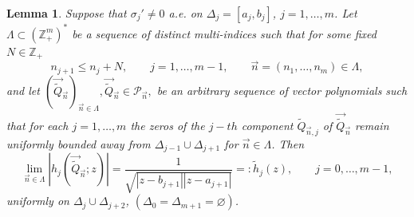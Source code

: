 \documentclass{amsart}
\numberwithin{equation}{section}
\newtheorem{lemma}[theorem]{Lemma}
\theoremstyle{definition}
\newcommand{\ZZ}{\mathbb{Z}}      %
\newcommand{\n}{\vec{n}}          %
\begin{document}
    \begin{lemma}
        \label{lem:hnj}
        Suppose that $\sigma_j'\neq 0 $ a.e. on $\Delta_j = [a_j,b_j]$, $j=1,\ldots,m $.  Let $\Lambda \subset (\ZZ_+^m)^*$ be a sequence of distinct multi-indices such that for some fixed $N \in \mathbb{Z}_+$
         \begin{equation}
        \label{N}
        n_{j+1} \leq n_j + N, \qquad j=1,\ldots,m-1, \qquad \n = (n_1,\ldots,n_m) \in \Lambda,
    \end{equation}
          and let $(\vec{\tilde{Q}}_{\n})_{\n \in \Lambda}, \vec{\tilde{Q}}_{\n} \in \mathcal{P}_{\n},$ be an arbitrary sequence of vector polynomials such that  for each $j=1,\ldots,m$ the zeros of the $j-th$ component $\tilde{Q}_{\n,j}$ of $\vec{\tilde{Q}}_{\n}$ remain uniformly bounded away from $\Delta_{j-1} \cup \Delta_{j+1}$ for $\n \in \Lambda$.    Then
        \begin{equation}
            \label{def:htil}
            \lim_{\n \in \Lambda} |{h}_{j}( {\vec{\tilde{Q}}}_{\n};z)| = \frac{1}{\sqrt{|z- b_{j+1}||z-a_{j+1}|}} =: \tilde{h}_j(z), \qquad j=0,\ldots,m-1,
        \end{equation}
        uniformly on $\Delta_{j} \cup \Delta_{j+2}$, $(\Delta_0 = \Delta_{m+1} = \varnothing)$.
    \end{lemma}
\end{document}
